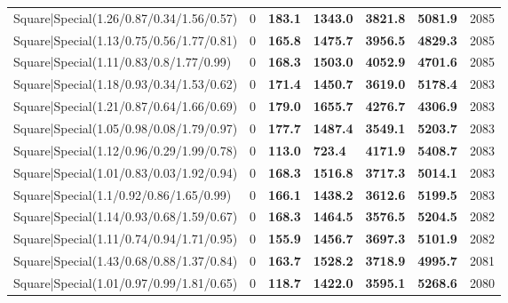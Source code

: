 \begin{tabular}{lrllllr}
 Square|Special(1.26/0.87/0.34/1.56/0.57)                      &             0   & \textbf{183.1} & \textbf{1343.0} & \textbf{3821.8} & \textbf{5081.9} &         2085 \\
 Square|Special(1.13/0.75/0.56/1.77/0.81)                      &             0   & \textbf{165.8} & \textbf{1475.7} & \textbf{3956.5} & \textbf{4829.3} &         2085 \\
 Square|Special(1.11/0.83/0.8/1.77/0.99)                       &             0   & \textbf{168.3} & \textbf{1503.0} & \textbf{4052.9} & \textbf{4701.6} &         2085 \\
 Square|Special(1.18/0.93/0.34/1.53/0.62)                      &             0   & \textbf{171.4} & \textbf{1450.7} & \textbf{3619.0} & \textbf{5178.4} &         2083 \\
 Square|Special(1.21/0.87/0.64/1.66/0.69)                      &             0   & \textbf{179.0} & \textbf{1655.7} & \textbf{4276.7} & \textbf{4306.9} &         2083 \\
 Square|Special(1.05/0.98/0.08/1.79/0.97)                      &             0   & \textbf{177.7} & \textbf{1487.4} & \textbf{3549.1} & \textbf{5203.7} &         2083 \\
 Square|Special(1.12/0.96/0.29/1.99/0.78)                      &             0   & \textbf{113.0} & \textbf{723.4}  & \textbf{4171.9} & \textbf{5408.7} &         2083 \\
 Square|Special(1.01/0.83/0.03/1.92/0.94)                      &             0   & \textbf{168.3} & \textbf{1516.8} & \textbf{3717.3} & \textbf{5014.1} &         2083 \\
 Square|Special(1.1/0.92/0.86/1.65/0.99)                       &             0   & \textbf{166.1} & \textbf{1438.2} & \textbf{3612.6} & \textbf{5199.5} &         2083 \\
 Square|Special(1.14/0.93/0.68/1.59/0.67)                      &             0   & \textbf{168.3} & \textbf{1464.5} & \textbf{3576.5} & \textbf{5204.5} &         2082 \\
 Square|Special(1.11/0.74/0.94/1.71/0.95)                      &             0   & \textbf{155.9} & \textbf{1456.7} & \textbf{3697.3} & \textbf{5101.9} &         2082 \\
 Square|Special(1.43/0.68/0.88/1.37/0.84)                      &             0   & \textbf{163.7} & \textbf{1528.2} & \textbf{3718.9} & \textbf{4995.7} &         2081 \\
 Square|Special(1.01/0.97/0.99/1.81/0.65)                      &             0   & \textbf{118.7} & \textbf{1422.0} & \textbf{3595.1} & \textbf{5268.6} &         2080 \\

\end{tabular}
